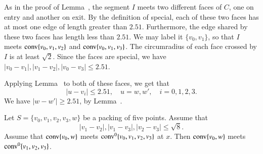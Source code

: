 \begin{tarskidata}
\begin{tarski}
\begin{proved} As in the proof of Lemma~,
the segment $I$ meets
two different faces of $C$, one on entry and another on exit.
By the definition of special, each of these two faces has at most
one edge of length greater than $2.51$.  Furthermore, the edge
shared by these two faces has length less than $2.51$.  We may
label it $\{v_0,v_1\}$, so that $I$ meets ${\operatorname{conv}}\{v_0,v_1,v_2\}$
and ${\operatorname{conv}}\{v_0,v_1,v_3\}$.   The circumradius
of each face crossed by $I$ is at least $\sqrt2$.
Since the faces are special,
we have $|v_0-v_1|,|v_1-v_2|,|v_0-v_3|\le 2.51$.  

Applying Lemma~
to both of these faces, we get that 
   $$
   |u-v_i|\le 2.51,\quad u=w,w',\quad i=0,1,2,3.
   $$
We have $|w-w'|\ge 2.51$, by Lemma~.\FIXX{$\CalE$}
%
%
\swallowed\end{proved}
\end{tarski}





\begin{tarski}

\begin{lemma}
Let $S=\{v_0,v_1,v_2,v_3,w\}$ be a packing of five points.
Assume that 
  $$
  |v_1-v_2|,|v_1-v_3|,|v_2-v_3|\le\sqrt8.
  $$
Assume that ${\operatorname{conv}}\{v_0,w\}$ meets ${\operatorname{conv}}^0\{v_0,v_1,v_2,v_3\}$ at $x$.
Then ${\operatorname{conv}}\{v_0,w\}$ meets ${\operatorname{conv}}^0\{v_1,v_2,v_3\}$.
\end{lemma}


\end{tarski}
\end{tarskidata}
